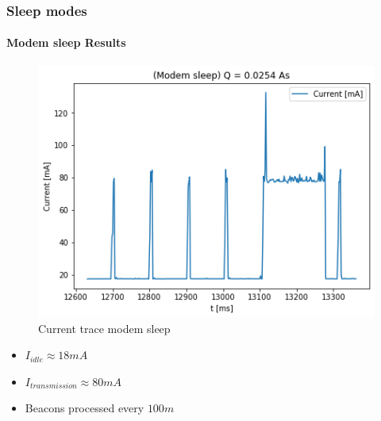 \begin{frame}
    \frametitle{Sleep modes}
    \framesubtitle{Modem sleep Results}

    \begin{minipage}{0.45 \textwidth}
        \begin{figure}[H]
            \centering
            \includegraphics[width = 1 \linewidth]{../paper/fig/modem_sleep.png}
            \caption{Current trace modem sleep}
            \label{fig:experiment_modem_light_sleep}
        \end{figure}
    \end{minipage}
    \begin{minipage}{0.45 \textwidth}
        \begin{itemize}
            \item $I_{idle} \approx 18mA$
            \item $I_{transmission} \approx 80mA$
            \item Beacons processed every $100m$
        \end{itemize}
    \end{minipage}
\end{frame}

